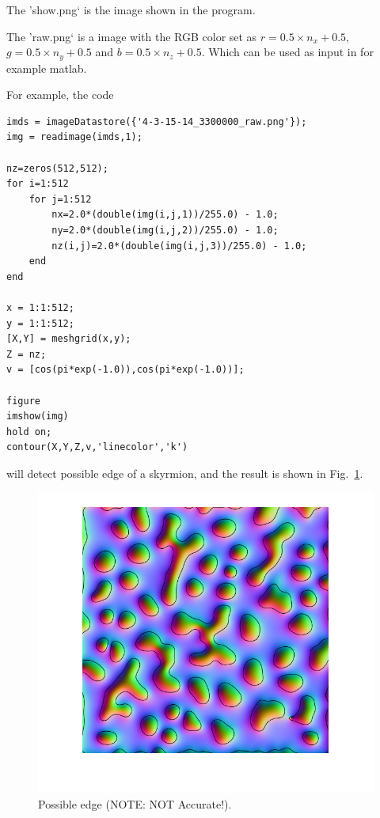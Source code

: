 \documentclass[aps,superscriptaddress,groupedaddress]{revtex4}  %
\begin{document}
The 'show.png` is the image shown in the program.

The 'raw.png` is a image with the RGB color set as $r=0.5\times n_x+0.5$, $g=0.5\times n_y+0.5$ and $b=0.5\times n_z+0.5$. Which can be used as input in for example matlab.

For example, the code
\begin{lstlisting}
imds = imageDatastore({'4-3-15-14_3300000_raw.png'});
img = readimage(imds,1);

nz=zeros(512,512);
for i=1:512
    for j=1:512
        nx=2.0*(double(img(i,j,1))/255.0) - 1.0;
        ny=2.0*(double(img(i,j,2))/255.0) - 1.0;
        nz(i,j)=2.0*(double(img(i,j,3))/255.0) - 1.0;
    end
end

x = 1:1:512;
y = 1:1:512;
[X,Y] = meshgrid(x,y);
Z = nz;
v = [cos(pi*exp(-1.0)),cos(pi*exp(-1.0))];

figure
imshow(img)
hold on;
contour(X,Y,Z,v,'linecolor','k')
\end{lstlisting}
will detect possible edge of a skyrmion, and the result is shown in Fig.~\ref{Fig:edge}.
\begin{figure}
\includegraphics[scale=0.5]{edges.png}
\caption{\label{Fig:edge}Possible edge (NOTE: NOT Accurate!).}
\end{figure}
\end{document}
